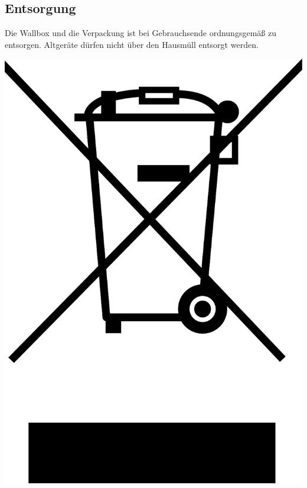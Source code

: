 \documentclass[a4paper,10pt]{article}
\begin{document}
\begin{multicols*}{2}
	\section{Entsorgung}
	\begin{minipage}{0.35\textwidth}
		Die Wallbox und die Verpackung ist bei Gebrauchsende ordnungsgemäß zu
		entsorgen. Altgeräte dürfen nicht über den Hausmüll entsorgt werden.
	\end{minipage}\hfill
	\begin{minipage}{0.1\textwidth}
		\includegraphics[width=\linewidth]{./img/resized/weee.pdf}
	\end{minipage}


\end{multicols*}
\end{document}

